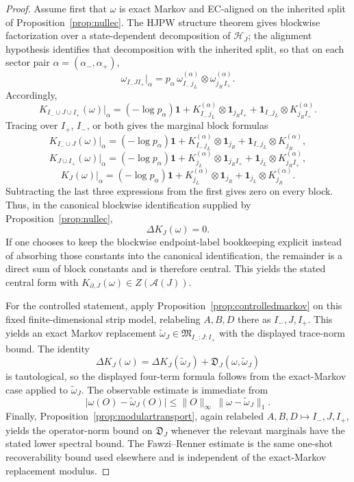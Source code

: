 \documentclass[11pt]{article}
\begin{document}
\begin{proof}
Assume first that \(\omega\) is exact Markov and EC-aligned on the inherited split of Proposition~\ref{prop:nullec}. The HJPW structure theorem gives blockwise factorization over a state-dependent decomposition of \(\mathcal H_J\); the alignment hypothesis identifies that decomposition with the inherited split, so that on each sector pair \(\alpha=(\alpha_-,\alpha_+)\),
\[
\omega_{I_-JI_+}|_\alpha
=
p_\alpha\,
\omega_{I_-\,j_L}^{(\alpha)}
\otimes
\omega_{j_R\,I_+}^{(\alpha)}.
\]
Accordingly,
\[
K_{I_-\cup J\cup I_+}(\omega)\big|_\alpha
=
(-\log p_\alpha)\mathbf 1
+
K_{I_-\,j_L}^{(\alpha)}\otimes \mathbf 1_{j_R I_+}
+
\mathbf 1_{I_- j_L}\otimes K_{j_R I_+}^{(\alpha)}.
\]
Tracing over \(I_+\), \(I_-\), or both gives the marginal block formulas
\[
K_{I_-\cup J}(\omega)\big|_\alpha
=
(-\log p_\alpha)\mathbf 1
+
K_{I_-\,j_L}^{(\alpha)}\otimes \mathbf 1_{j_R}
+
\mathbf 1_{I_- j_L}\otimes K_{j_R}^{(\alpha)},
\]
\[
K_{J\cup I_+}(\omega)\big|_\alpha
=
(-\log p_\alpha)\mathbf 1
+
K_{j_L}^{(\alpha)}\otimes \mathbf 1_{j_R I_+}
+
\mathbf 1_{j_L}\otimes K_{j_R I_+}^{(\alpha)},
\]
\[
K_J(\omega)\big|_\alpha
=
(-\log p_\alpha)\mathbf 1
+
K_{j_L}^{(\alpha)}\otimes \mathbf 1_{j_R}
+
\mathbf 1_{j_L}\otimes K_{j_R}^{(\alpha)}.
\]
Subtracting the last three expressions from the first gives zero on every block. Thus, in the canonical blockwise identification supplied by Proposition~\ref{prop:nullec},
\[
\Delta K_J(\omega)=0.
\]
If one chooses to keep the blockwise endpoint-label bookkeeping explicit instead of absorbing those constants into the canonical identification, the remainder is a direct sum of block constants and is therefore central. This yields the stated central form with \(K_{\partial,J}(\omega)\in Z(\mathcal A(J))\).

For the controlled statement, apply Proposition~\ref{prop:controlledmarkov} on this fixed finite-dimensional strip model, relabeling \(A,B,D\) there as \(I_-,J,I_+\). This yields an exact Markov replacement \(\widetilde\omega_J\in \mathfrak M_{I_-:J:I_+}\) with the displayed trace-norm bound. The identity
\[
\Delta K_J(\omega)=\Delta K_J(\widetilde\omega_J)+\mathfrak D_J(\omega,\widetilde\omega_J)
\]
is tautological, so the displayed four-term formula follows from the exact-Markov case applied to \(\widetilde\omega_J\). The observable estimate is immediate from
\[
\bigl|\omega(O)-\widetilde\omega_J(O)\bigr|
\le
\|O\|_\infty\,
\|\omega-\widetilde\omega_J\|_1.
\]
Finally, Proposition~\ref{prop:modulartransport}, again relabeled \(A,B,D\mapsto I_-,J,I_+\), yields the operator-norm bound on \(\mathfrak D_J\) whenever the relevant marginals have the stated lower spectral bound. The Fawzi--Renner estimate is the same one-shot recoverability bound used elsewhere and is independent of the exact-Markov replacement modulus.
\end{proof}
\end{document}
